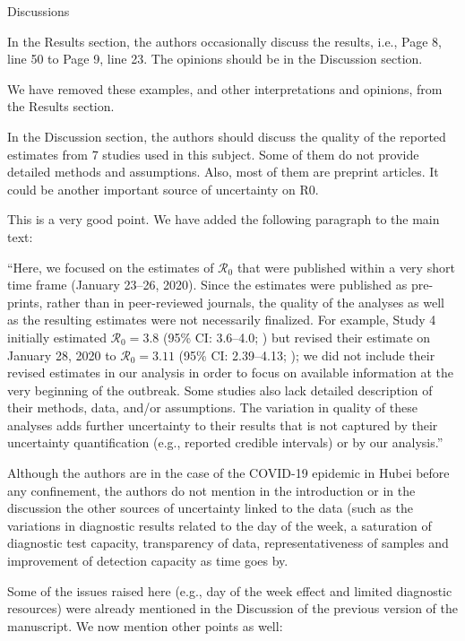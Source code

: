 \documentclass[12pt]{article}
\newcommand{\Ro}{\ensuremath{{\mathcal R}_{0}}\xspace}
\newcommand{\revtext}{\textsf}
\begin{document}
\revtext{Discussions}

\revtext{In the Results section, the authors occasionally discuss the results, i.e., Page 8, line 50 to Page
9, line 23. The opinions should be in the Discussion section.}

We have removed these examples, and other interpretations and opinions, from the Results section.

\revtext{In the Discussion section, the authors should discuss the quality of the reported estimates from
7 studies used in this subject. Some of them do not provide detailed methods and assumptions.
Also, most of them are preprint articles. It could be another important source of uncertainty on
R0.}

This is a very good point. We have added the following paragraph to the main text:

``Here, we focused on the estimates of \Ro that were published within a very short time frame (January 23--26, 2020).
Since the estimates were published as pre-prints, rather than in peer-reviewed journals, the quality of the analyses as well as the resulting estimates were not necessarily finalized.
For example, Study 4 initially estimated $\Ro = 3.8$ (95\% CI: 3.6--4.0; \cite{readncov}) but revised their estimate on January 28, 2020 to $\Ro = 3.11$ (95\% CI: 2.39--4.13; \cite{readncov2});
we did not include their revised estimates in our analysis in order to focus on available information at the very beginning of the outbreak.
Some studies also lack detailed description of their methods, data, and/or assumptions.
The variation in quality of these analyses adds further uncertainty to their results that is not captured by their uncertainty quantification (e.g., reported credible intervals) or by our analysis.''

\revtext{Although the authors are in the case of the COVID-19 epidemic in Hubei before any
confinement, the authors do not mention in the introduction or in the discussion the other
sources of uncertainty linked to the data (such as the variations in diagnostic results related to
the day of the week, a saturation of diagnostic test capacity, transparency of data,
representativeness of samples and improvement of detection capacity as time goes by.}

Some of the issues raised here (e.g., day of the week effect and limited diagnostic resources) were already mentioned in the Discussion of the previous version of the manuscript. We now mention other points as well:
\end{document}

